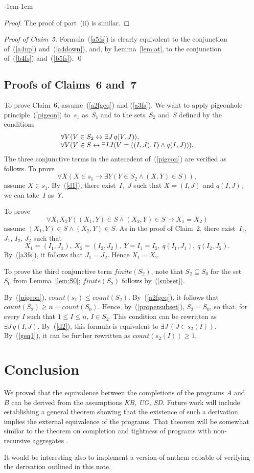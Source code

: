 \documentclass[11pt]{article}
\def\fnt{\mathit{finite}}
\def\lrar{\leftrightarrow}
\def\ba{\begin{array}}
\def\ea{\end{array}}
\def\kbugsd{\emph{KB, UG, SD}}
\newcommand{\co}{\ensuremath{\mathit{count}}}
\begin{document}
\begin{adjustwidth}{-1cm}{-1cm}
\begin{proof}
The proof of part~(ii) is similar.
\end{proof}

\medskip\noindent\emph{Proof of Claim~5.}
Formula~(\ref{a5fs}) is clearly equivalent to the conjunction of~(\ref{a4up})
and~(\ref{a4down}), and, by Lemma~\ref{lem:at}, to the conjunction
of~(\ref{b4fs}) and~(\ref{b5fs}).
\qed

\subsection{Proofs of Claims~6 and~7}

To prove Claim~6, assume~(\ref{a2fgeq}) and (\ref{a3fs}).
We want to apply pigeonhole principle~(\ref{pigeon}) to~$s_1$
as~$S_1$ and to the sets~$S_2$ and~$S$ defined by the conditions
$$\ba l
\forall V(V\in S_2 \lrar \exists J\, q(V,J)),\\
\forall V(V\in S \lrar \exists IJ(V=((I,J),I)\land q(I,J))).
\ea$$
The three conjunctive terms in the antecedent of~(\ref{pigeon}) are verified
as follows.  To prove
$$\forall X(X\in s_1 \to \exists Y (Y\in S_2 \land (X,Y)\in S)),$$
assume $X\in s_1$.  By~(\ref{d1}), there exist~$I$,~$J$ such that
$X=(I,J)$ and $q(I,J)$; we can take~$I$ as~$Y$.

To prove
$$\forall X_1X_2Y((X_1,Y)\in S \land (X_2,Y)\in S \to X_1=X_2)$$
assume $(X_1,Y)\in S \land (X_2,Y)\in S$.  As in the proof of Claim~2,
there exist~$I_1$, $J_1$, $I_2$, $J_2$ such that
$$X_1=(I_1,J_1),\ X_2=(I_2,J_2),\ Y=I_1=I_2,\ q(I_1,J_1),\ q(I_2,J_2).$$
By~(\ref{a3fs}), it follows that $J_1=J_2$.  Hence $X_1=X_2$.

To prove the third conjunctive term $\fnt(S_2)$, note that $S_2\subseteq S_0$
for the set~$S_0$ from Lemma~\ref{lem:S0}; $\fnt(S_2)$ follows
by~(\ref{subset}).

By~(\ref{pigeon}), $\co(s_1)\leq \co(S_2)$.  By~(\ref{a2fgeq}), it
follows that $\co(S_2)\geq n=\co(S_0)$.  Hence, by~(\ref{propersubset}),
$S_2=S_0$, so that, for every $I$ such that $1\leq I\leq n$, $I\in S_2$.
This condition can be rewritten as $\exists J\,q(I,J)$.  By~(\ref{d2}),
this formula is equivalent to $\exists J\,(J\in s_2(I))$.  By~(\ref{geq1}),
it can be further rewritten as $\co(s_2(I))\geq 1$.

\section{Conclusion}

We proved that the equivalence between the completions of the
programs $A$ and $B$ can be derived from the assumptions \kbugsd.
Future work will include establishing a general theorem showing that
the existence of such a derivation implies the external equivalence of
the programs.  That theorem will be somewhat similar to the theorem on
completion and tightness of
programs with non-recursive aggregates \cite[Section~7.1]{fan24b}.

It would be interesting also to implement a version of {\sc anthem}
\cite{fan25} capable of verifying the derivation outlined in this note.



\end{adjustwidth}
\end{document}
